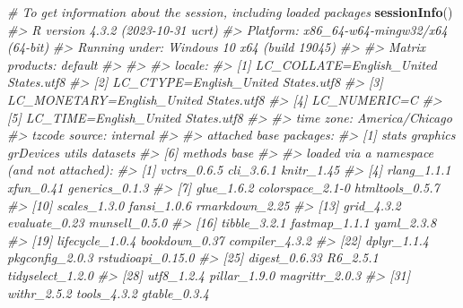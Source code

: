 \documentclass[
]{book}
\newenvironment{Shaded}{\begin{snugshade}}{\end{snugshade}}
\newcommand{\CommentTok}[1]{\textcolor[rgb]{0.56,0.35,0.01}{\textit{#1}}}
\newcommand{\FunctionTok}[1]{\textcolor[rgb]{0.13,0.29,0.53}{\textbf{#1}}}
\newcommand{\NormalTok}[1]{#1}
\begin{document}
\begin{Shaded}
\begin{Highlighting}[]
\CommentTok{\# To get information about the session, including loaded packages}
\FunctionTok{sessionInfo}\NormalTok{()}
\CommentTok{\#\textgreater{} R version 4.3.2 (2023{-}10{-}31 ucrt)}
\CommentTok{\#\textgreater{} Platform: x86\_64{-}w64{-}mingw32/x64 (64{-}bit)}
\CommentTok{\#\textgreater{} Running under: Windows 10 x64 (build 19045)}
\CommentTok{\#\textgreater{} }
\CommentTok{\#\textgreater{} Matrix products: default}
\CommentTok{\#\textgreater{} }
\CommentTok{\#\textgreater{} }
\CommentTok{\#\textgreater{} locale:}
\CommentTok{\#\textgreater{} [1] LC\_COLLATE=English\_United States.utf8 }
\CommentTok{\#\textgreater{} [2] LC\_CTYPE=English\_United States.utf8   }
\CommentTok{\#\textgreater{} [3] LC\_MONETARY=English\_United States.utf8}
\CommentTok{\#\textgreater{} [4] LC\_NUMERIC=C                          }
\CommentTok{\#\textgreater{} [5] LC\_TIME=English\_United States.utf8    }
\CommentTok{\#\textgreater{} }
\CommentTok{\#\textgreater{} time zone: America/Chicago}
\CommentTok{\#\textgreater{} tzcode source: internal}
\CommentTok{\#\textgreater{} }
\CommentTok{\#\textgreater{} attached base packages:}
\CommentTok{\#\textgreater{} [1] stats     graphics  grDevices utils     datasets }
\CommentTok{\#\textgreater{} [6] methods   base     }
\CommentTok{\#\textgreater{} }
\CommentTok{\#\textgreater{} loaded via a namespace (and not attached):}
\CommentTok{\#\textgreater{}  [1] vctrs\_0.6.5       cli\_3.6.1         knitr\_1.45       }
\CommentTok{\#\textgreater{}  [4] rlang\_1.1.1       xfun\_0.41         generics\_0.1.3   }
\CommentTok{\#\textgreater{}  [7] glue\_1.6.2        colorspace\_2.1{-}0  htmltools\_0.5.7  }
\CommentTok{\#\textgreater{} [10] scales\_1.3.0      fansi\_1.0.6       rmarkdown\_2.25   }
\CommentTok{\#\textgreater{} [13] grid\_4.3.2        evaluate\_0.23     munsell\_0.5.0    }
\CommentTok{\#\textgreater{} [16] tibble\_3.2.1      fastmap\_1.1.1     yaml\_2.3.8       }
\CommentTok{\#\textgreater{} [19] lifecycle\_1.0.4   bookdown\_0.37     compiler\_4.3.2   }
\CommentTok{\#\textgreater{} [22] dplyr\_1.1.4       pkgconfig\_2.0.3   rstudioapi\_0.15.0}
\CommentTok{\#\textgreater{} [25] digest\_0.6.33     R6\_2.5.1          tidyselect\_1.2.0 }
\CommentTok{\#\textgreater{} [28] utf8\_1.2.4        pillar\_1.9.0      magrittr\_2.0.3   }
\CommentTok{\#\textgreater{} [31] withr\_2.5.2       tools\_4.3.2       gtable\_0.3.4}
\end{Highlighting}
\end{Shaded}
\end{document}
